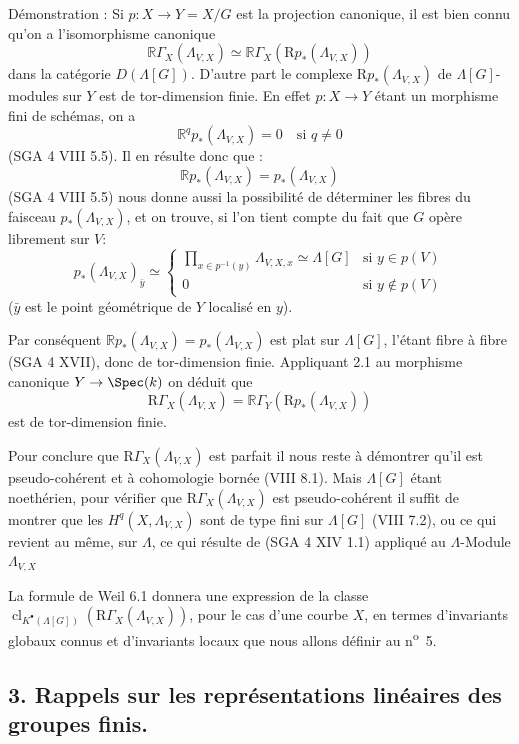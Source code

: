 Démonstration : Si $p:X\to Y=X/G$ est la projection canonique, il est bien connu qu'on a l'isomorphisme canonique
\[
\mathbb{R}\Gamma_X(\Lambda_{V,X})\simeq \mathbb{R}\Gamma_X(\mathrm{R}p_*(\Lambda_{V,X}))
\]
dans la catégorie $D(\Lambda[G])$. D'autre part le complexe $\mathrm{R}p_*(\Lambda_{V,X})$ de $\Lambda[G]$-modules sur $Y$ est de tor-dimension finie. En effet $p:X\to Y$ étant un morphisme fini de schémas, on a
\[
\mathbb{R}^q p_*(\Lambda_{V,X})=0\quad\text{si }q\ne0
\]
(SGA 4 VIII 5.5). Il en résulte donc que :
\[
\mathbb{R} p_*(\Lambda_{V,X})=p_*(\Lambda_{V,X})
\]
(SGA 4
VIII 5.5) nous donne aussi la possibilité de déterminer les fibres du faisceau $p_*(\Lambda_{V,X})$, et on trouve, si l'on tient compte du fait que $G$ opère librement sur $V$:
\[
p_*(\Lambda_{V,X})_{\bar y}\simeq
\begin{cases}
\displaystyle \prod_{x\in p^{-1}(y)}\Lambda_{V,X,x}\simeq \Lambda[G]& \text{si } y\in p(V)\\[1em]
0& \text{si } y\notin p(V)
\end{cases}
\]
($\bar y$ est le point géométrique de $Y$ localisé en $y$).

Par conséquent $\mathbb{R} p_*(\Lambda_{V,X})=p_*(\Lambda_{V,X})$ est plat sur $\Lambda[G]$, l'étant fibre à fibre (SGA 4 XVII), donc de tor-dimension finie. Appliquant 2.1 au morphisme canonique $Y\to\Spec(k)$ on déduit que
\[
\mathrm{R}\Gamma_X(\Lambda_{V,X})=\mathbb{R}\Gamma_Y(\mathrm{R}p_*(\Lambda_{V,X}))
\]
est de tor-dimension finie.

Pour conclure que $\mathrm{R}\Gamma_X(\Lambda_{V,X})$ est parfait il nous reste à démontrer qu'il est pseudo-cohérent et à cohomologie bornée (VIII 8.1). Mais $\Lambda[G]$ étant noethérien, pour vérifier que $\mathrm{R}\Gamma_X(\Lambda_{V,X})$ est pseudo-cohérent il suffit de montrer que les $H^q(X,\Lambda_{V,X})$ sont de type fini sur $\Lambda[G]$ (VIII 7.2), ou ce qui revient au même, sur $\Lambda$, ce qui résulte de (SGA 4 XIV 1.1) appliqué au $\Lambda$-Module $\Lambda_{V,X}$

La formule de Weil 6.1 donnera une expression de la classe $\operatorname{cl}_{K^\bullet(\Lambda[G])}(\mathrm{R}\Gamma_X(\Lambda_{V,X}))$, pour le cas d'une courbe $X$, en termes d'invariants globaux connus et d'invariants locaux que nous allons définir au n\textsuperscript{o}~5.

\subsection*{3. Rappels sur les représentations linéaires des groupes finis.}

